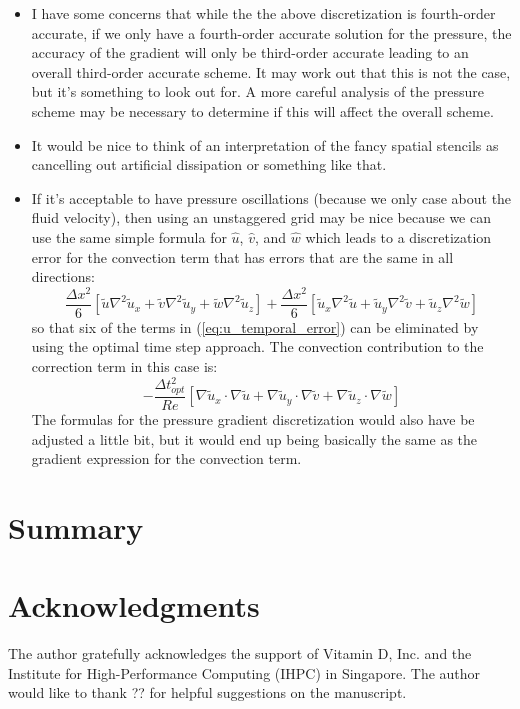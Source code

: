 \documentclass[fleqn,12pt,twoside]{article}
\newcommand{\beq}{\begin{equation}}
\newcommand{\eeq}{\end{equation}}
\def\grad{\ensuremath{\nabla}}
\def\lapl{\ensuremath{\nabla^2}}
\def\tu{\tilde{u}}
\def\tv{\tilde{v}}
\def\tw{\tilde{w}}
\def\dt{\Delta t}
\def\dx{\Delta x}
\def\dto{\dt_{opt}}
\begin{document}
\begin{itemize}
\item I have some concerns that while the the above discretization is
fourth-order accurate, if we only have a fourth-order accurate solution for 
the pressure, the accuracy of the gradient will only be third-order accurate
leading to an overall third-order accurate scheme.  It may work out that this
is not the case, but it's something to look out for.  A more careful 
analysis of the pressure scheme may be necessary to determine if this will 
affect the overall scheme.

\item It would be nice to think of an interpretation of the fancy spatial
stencils as cancelling out artificial dissipation or something like that.

\item If it's acceptable to have pressure oscillations (because we only
case about the fluid velocity), then using an unstaggered grid may be nice
because we can use the same simple formula for 
$\hat{u}$, $\hat{v}$, and $\hat{w}$ which leads to a discretization error
for the convection term that has errors that are the same in all directions:
\beq
  \frac{\dx^2}{6}
  \left[\tu \lapl \tu_x + \tv \lapl \tu_y + \tw \lapl \tu_z \right]
  + \frac{\dx^2}{6} 
  \left[ \tu_x \lapl \tu + \tu_y \lapl \tv + \tu_z \lapl \tw \right]
\eeq
so that six of the terms in (\ref{eq:u_temporal_error}) can be eliminated
by using the optimal time step approach.  The convection contribution to 
the correction term in this case is:
\beq
  -\frac{\dto^2}{Re} 
  \left[ \grad \tu_x \cdot \grad \tu
       + \grad \tu_y \cdot \grad \tv
       + \grad \tu_z \cdot \grad \tw
  \right]
\eeq
The formulas for the pressure gradient discretization would also have be 
adjusted a little bit, but it would end up being basically the same as the
gradient expression for the convection term.

\end{itemize}


\section{\label{sec:summary} Summary} 


\section*{Acknowledgments}
The author gratefully acknowledges the support of Vitamin D, Inc.
and the Institute for High-Performance Computing (IHPC) in Singapore. 
The author would like to thank ??  for helpful suggestions on the manuscript.  


\end{document}

